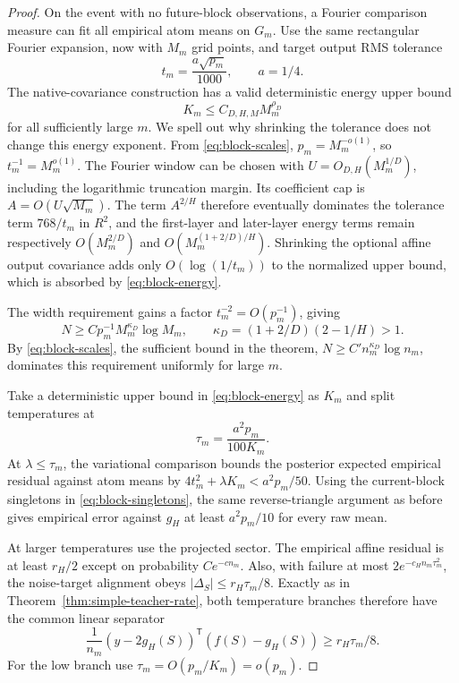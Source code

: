 \begin{proof}
On the event with no future-block observations, a Fourier comparison measure can fit all empirical atom means on $G_m$. Use the same rectangular Fourier expansion, now with $M_m$ grid points, and target output RMS tolerance
\[
 t_m=\frac{a\sqrt{p_m}}{1000},\qquad a=1/4.
\]
The native-covariance construction has a valid deterministic energy upper bound
\begin{equation}
 K_m\le C_{D,H,M} M_m^{\rho_D}
 \label{eq:block-energy}
\end{equation}
for all sufficiently large $m$. We spell out why shrinking the tolerance does not change this energy exponent. From \eqref{eq:block-scales}, $p_m=M_m^{-o(1)}$, so $t_m^{-1}=M_m^{o(1)}$. The Fourier window can be chosen with $U=O_{D,H}(M_m^{1/D})$, including the logarithmic truncation margin. Its coefficient cap is $A=O(U\sqrt{M_m})$. The term $A^{2/H}$ therefore eventually dominates the tolerance term $768/t_m$ in $R^2$, and the first-layer and later-layer energy terms remain respectively $O(M_m^{2/D})$ and $O(M_m^{(1+2/D)/H})$. Shrinking the optional affine output covariance adds only $O(\log(1/t_m))$ to the normalized upper bound, which is absorbed by \eqref{eq:block-energy}.

The width requirement gains a factor $t_m^{-2}=O(p_m^{-1})$, giving
\[
 N\ge C p_m^{-1}M_m^{\kappa_D}\log M_m,
 \qquad \kappa_D=(1+2/D)(2-1/H)>1.
\]
By \eqref{eq:block-scales}, the sufficient bound in the theorem, $N\ge C'n_m^{\kappa_D}\log n_m$, dominates this requirement uniformly for large $m$.

Take a deterministic upper bound in \eqref{eq:block-energy} as $K_m$ and split temperatures at
\[
 \tau_m=\frac{a^2p_m}{100K_m}.
\]
At $\lambda\le\tau_m$, the variational comparison bounds the posterior expected empirical residual against atom means by $4t_m^2+\lambda K_m<a^2p_m/50$. Using the current-block singletons in \eqref{eq:block-singletons}, the same reverse-triangle argument as before gives empirical error against $g_H$ at least $a^2p_m/10$ for every raw mean.

At larger temperatures use the projected sector. The empirical affine residual is at least $r_H/2$ except on probability $Ce^{-cn_m}$. Also, with failure at most $2e^{-c_Hn_m\tau_m^2}$, the noise-target alignment obeys $|\Delta_S|\le r_H\tau_m/8$. Exactly as in Theorem~\ref{thm:simple-teacher-rate}, both temperature branches therefore have the common linear separator
\[
 \frac1{n_m}(y-2g_H(S))^{\mathsf T}(f(S)-g_H(S))\ge r_H\tau_m/8.
\]
For the low branch use $\tau_m=O(p_m/K_m)=o(p_m)$.


\end{proof}

